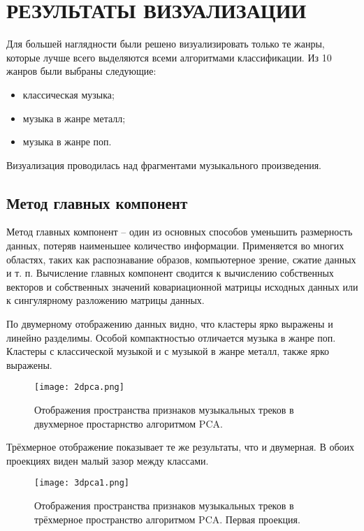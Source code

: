 \section{РЕЗУЛЬТАТЫ ВИЗУАЛИЗАЦИИ}
\label{sec:visualization}


Для большей наглядности были решено визуализировать только те жанры, которые лучше всего выделяются всеми алгоритмами классификации. Из 10 жанров были выбраны следующие:
\begin{itemize}
\item классическая музыка;
\item музыка в жанре металл;
\item музыка в жанре поп.
\end{itemize}

Визуализация проводилась над фрагментами музыкального произведения.

\subsection{Метод главных компонент} 
\label{sub:pca}
Метод главных компонент -- один из основных способов уменьшить размерность данных, потеряв наименьшее количество информации. Применяется во многих областях, таких как распознавание образов, компьютерное зрение, сжатие данных и т. п. Вычисление главных компонент сводится к вычислению собственных векторов и собственных значений ковариационной матрицы исходных данных или к сингулярному разложению матрицы данных. 



По двумерному отображению данных видно, что кластеры ярко выражены и линейно разделимы. Особой компактностью отличается музыка в жанре поп. Кластеры с классической музыкой и с музыкой в жанре металл, также ярко выражены.
\begin{figure}[h]
\centering
  \texttt{[image: 2dpca.png]}
  \caption{Отображения пространства  признаков музыкальных треков в двухмерное простарнство алгоритмом PCA.}
  \label{fig:results:2dtsne}
\end{figure}

Трёхмерное отображение показывает те же результаты, что и двумерная. В обоих проекциях виден малый зазор между классами.

\begin{figure}[h]
\centering
  \texttt{[image: 3dpca1.png]}
  \caption{Отображения пространства  признаков музыкальных треков в трёхмерное пространство алгоритмом PCA. Первая проекция. }
  \label{fig:results:2dtsne}
\end{figure}


